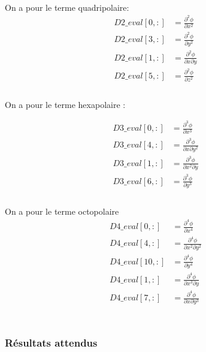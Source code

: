 \documentclass{article}
\begin{document}
\
\\
On a pour le terme quadripolaire:
\begin{align*}
D2\_eval[0, :] &= \frac{\partial^{2} \phi}{\partial x^{2}} \\
D2\_eval[3, :] &= \frac{\partial^{2} \phi}{\partial y^{2}} \\
D2\_eval[1, :] &= \frac{\partial^{2} \phi}{\partial x \partial y}\\
D2\_eval[5, :] &= \frac{\partial^{2} \phi}{\partial z^2}\\
\end{align*}
\
\\
On a pour le terme hexapolaire  : 

\begin{align*}
D3\_eval[0, :] &= \frac{\partial^{3} \phi}{\partial x^{3}} \\
D3\_eval[4, :] &= \frac{\partial^{3} \phi}{\partial x\partial y^{2}} \\
D3\_eval[1, :] &= \frac{\partial^{3} \phi}{\partial x^{2} \partial y}\\
D3\_eval[6, :] &= \frac{\partial^{3} \phi}{\partial y^{3}} \\
\end{align*}
\
\\
On a pour le terme octopolaire 
\begin{align*}
D4\_eval[0, :] &= \frac{\partial^{4} \phi}{\partial x^{4}} \\
D4\_eval[4, :] &= \frac{\partial^{4} \phi}{\partial x^{2}\partial y^{2}} \\
D4\_eval[10, :] &= \frac{\partial^{4} \phi}{\partial y^{4}}\\
D4\_eval[1, :] &= \frac{\partial^{4} \phi}{\partial x^{3}\partial y }\\
D4\_eval[7, :] &= \frac{\partial^{4} \phi}{\partial x\partial y^{3}}\\
\end{align*}
\
\\
\subsubsection{Résultats attendus}
\
\\
\end{document}
